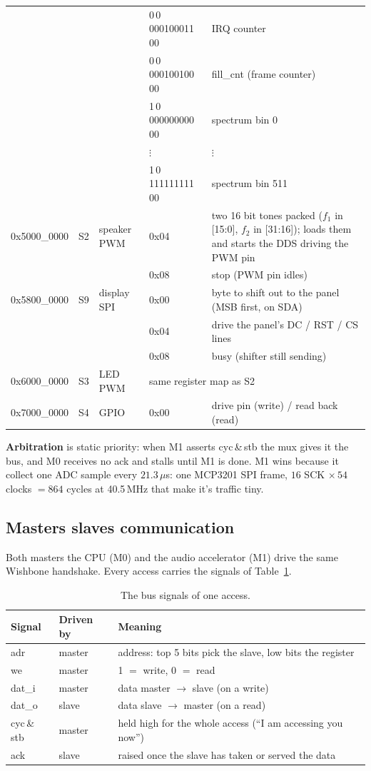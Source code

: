 \documentclass[a4paper,10pt]{article}
\begin{document}
{\begin{longtable}{l l l l p{6.7cm}}
 & & & 0\,0\,000100011\,00 & IRQ counter \\
 & & & 0\,0\,000100100\,00 & fill\_cnt (frame counter) \\
 & & & 1\,0\,000000000\,00 & spectrum bin 0 \\
 & & & $\vdots$ & $\vdots$ \\
 & & & 1\,0\,111111111\,00 & spectrum bin 511 \\
\midrule
0x5000\_0000 & S2 & speaker PWM
 & 0x04 & two 16 bit tones packed ($f_1$ in [15:0], $f_2$ in [31:16]);
 loads them and starts the DDS driving the PWM pin \\
 & & & 0x08 & stop (PWM pin idles) \\
\midrule
0x5800\_0000 & S9 & display SPI
 & 0x00 & byte to shift out to the panel (MSB first, on SDA) \\
 & & & 0x04 & drive the panel's DC / RST / CS lines \\
 & & & 0x08 & busy (shifter still sending) \\
\midrule
0x6000\_0000 & S3 & LED PWM & \multicolumn{2}{l}{same register map as S2} \\
\midrule
0x7000\_0000 & S4 & GPIO & 0x00 & drive pin (write) / read back (read) \\
\end{longtable}
}

\textbf{Arbitration} is static priority: when M1 asserts
cyc\,\&\,stb the mux gives it the bus, and M0 receives no ack and
stalls until M1 is done. M1 wins because it collect
one ADC sample every $21.3\,\mu$s: one MCP3201 SPI frame, $16$ SCK $\times\,54$
clocks $=864$ cycles at 40.5\,MHz that make it's traffic tiny.

\subsection{Masters slaves communication}
\label{sec:wbrules}

Both masters the CPU (M0) and the audio accelerator (M1) drive the same
Wishbone handshake. Every access carries the signals of
Table~\ref{tab:wb}.

\begin{table}[H]
\centering
\caption{The bus signals of one access.}
\label{tab:wb}
\small
\begin{tabular}{lll}
\toprule
\textbf{Signal} & \textbf{Driven by} & \textbf{Meaning} \\
\midrule
adr & master & address: top 5 bits pick the slave, low bits the register \\
we & master & 1 $=$ write, 0 $=$ read \\
dat\_i & master & data master $\to$ slave (on a write) \\
dat\_o & slave & data slave $\to$ master (on a read) \\
cyc\,\&\,stb & master & held high for the whole access (``I am accessing you now'') \\
ack & slave & raised once the slave has taken or served the data \\
\bottomrule
\end{tabular}
\end{table}
\end{document}
